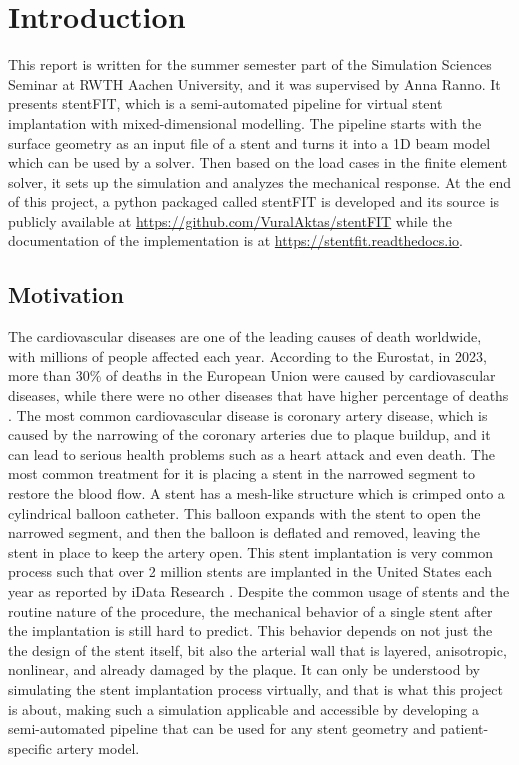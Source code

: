 \section{Introduction}
\label{sec:introduction}

This report is written for the summer semester part of the Simulation Sciences Seminar at RWTH Aachen University, and it was supervised by Anna Ranno. It presents stentFIT, which is a semi-automated pipeline for virtual stent implantation with mixed-dimensional modelling. The pipeline starts with the surface geometry as an input file of a stent and turns it into a 1D beam model which can be used by a solver. Then based on the load cases in the finite element solver, it sets up the simulation and analyzes the mechanical response. At the end of this project, a python packaged called stentFIT is developed and its source is publicly available at \url{https://github.com/VuralAktas/stentFIT} while the documentation of the implementation is at \url{https://stentfit.readthedocs.io}.


\subsection{Motivation}
\label{sec:motivation}

The cardiovascular diseases are one of the leading causes of death worldwide, with millions of people affected each year. According to the Eurostat, in 2023, more than 30\% of deaths in the European Union were caused by cardiovascular diseases, while there were no other diseases that have higher percentage of deaths \citep{eurostat2023}. The most common cardiovascular disease is coronary artery disease, which is caused by the narrowing of the coronary arteries due to plaque buildup, and it can lead to serious health problems such as a heart attack and even death. The most common treatment for it is placing a stent in the narrowed segment to restore the blood flow. A stent has a mesh-like structure which is crimped onto a cylindrical balloon catheter. This balloon expands with the stent to open the narrowed segment, and then the balloon is deflated and removed, leaving the stent in place to keep the artery open. This stent implantation is very common process such that over 2 million stents are implanted in the United States each year as reported by iData Research \citep{idata2024}. Despite the common usage of stents and the routine nature of the procedure, the mechanical behavior of a single stent after the implantation is still hard to predict. This behavior depends on not just the the design of the stent itself, bit also the arterial wall that is layered, anisotropic, nonlinear, and already damaged by the plaque. It can only be understood by simulating the stent implantation process virtually, and that is what this project is about, making such a simulation applicable and accessible by developing a semi-automated pipeline that can be used for any stent geometry and patient-specific artery model.


